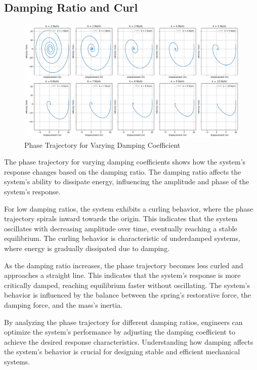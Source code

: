 \documentclass[12pt,a4paper]{article}
\begin{document}
{\vspace{5pt}}

\subsection{Damping Ratio and Curl}
\begin{figure}[H]
    \centering
    \includegraphics[width=1\textwidth]{damping_ratio_to_curl.png} 
    \caption{Phase Trajectory for Varying Damping Coefficient}
    \label{fig:system}
\end{figure}
{\vspace{10pt}}


The phase trajectory for varying damping coefficients shows how the system's response changes based on the damping ratio. The damping ratio affects the system's ability to dissipate energy, influencing the amplitude and phase of the system's response.

For low damping ratios, the system exhibits a curling behavior, where the phase trajectory spirals inward towards the origin. This indicates that the system oscillates with decreasing amplitude over time, eventually reaching a stable equilibrium. The curling behavior is characteristic of underdamped systems, where energy is gradually dissipated due to damping.

As the damping ratio increases, the phase trajectory becomes less curled and approaches a straight line. This indicates that the system's response is more critically damped, reaching equilibrium faster without oscillating. The system's behavior is influenced by the balance between the spring's restorative force, the damping force, and the mass's inertia.

By analyzing the phase trajectory for different damping ratios, engineers can optimize the system's performance by adjusting the damping coefficient to achieve the desired response characteristics. Understanding how damping affects the system's behavior is crucial for designing stable and efficient mechanical systems.
\end{document}
